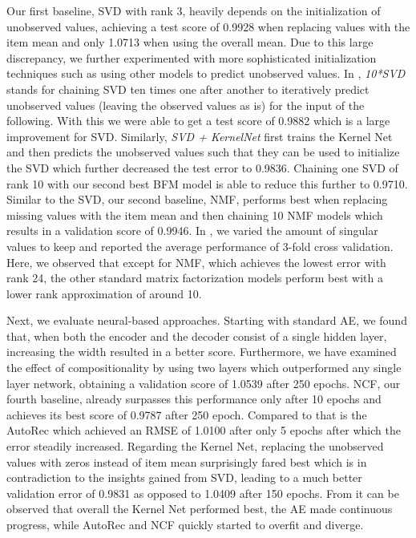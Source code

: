 \documentclass[10pt,conference,compsocconf]{IEEEtran}
\begin{document}
    Our first baseline, SVD with rank 3, heavily depends on the initialization of unobserved values, achieving a test score of 0.9928 when replacing values with the item mean and only 1.0713 when using the overall mean.
    Due to this large discrepancy, we further experimented with more sophisticated initialization techniques such as using other models to predict unobserved values.
    In , \textit{10*SVD} stands for chaining SVD ten times one after another to iteratively predict unobserved values (leaving the observed values as is) for the input of the following.
    With this we were able to get a test score of 0.9882 which is a large improvement for SVD.
    Similarly, \textit{SVD + KernelNet} first trains the Kernel Net and then predicts the unobserved values such that they can be used to initialize the SVD which further decreased the test error to 0.9836.
    Chaining one SVD of rank 10 with our second best BFM model is able to reduce this further to 0.9710.
    Similar to the SVD, our second baseline, NMF, performs best when replacing missing values with the item mean and then chaining 10 NMF models which results in a validation score of 0.9946.
    In , we varied the amount of singular values to keep and reported the average performance of 3-fold cross validation.
    Here, we observed that except for NMF, which achieves the lowest error with rank 24, the other standard matrix factorization models perform best with a lower rank approximation of around 10.

    Next, we evaluate neural-based approaches.
    Starting with standard AE, we found that, when both the encoder and the decoder consist of a single hidden layer, increasing the width resulted in a better score.
    Furthermore, we have examined the effect of compositionality by using two layers which outperformed any single layer network, obtaining a validation score of 1.0539 after 250 epochs.
    NCF, our fourth baseline, already surpasses this performance only after 10 epochs and achieves its best score of 0.9787 after 250 epoch.
    Compared to that is the AutoRec which achieved an RMSE of 1.0100 after only 5 epochs after which the error steadily increased.
    Regarding the Kernel Net, replacing the unobserved values with zeros instead of item mean surprisingly fared best which is in contradiction to the insights gained from SVD, leading to a much better validation error of 0.9831 as opposed to 1.0409 after 150 epochs.
    From  it can be observed that overall the Kernel Net performed best, the AE made continuous progress, while AutoRec and NCF quickly started to overfit and diverge.
\end{document}
